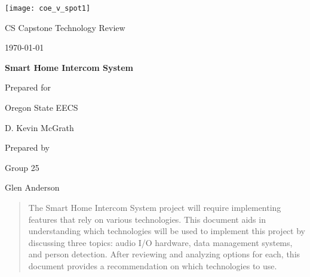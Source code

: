 \documentclass[onecolumn, draftclsnofoot,10pt, compsoc]{IEEEtran}
\def \CapstoneTeamName{			Team 25}
\def \CapstoneTeamNumber{		25}
\def \GroupMemberOne{			Lazar Sharipoff}
\def \GroupMemberTwo{			Jordan Davis}
\def \GroupMemberThree{			Glen Anderson}
\def \CapstoneProjectName{		Smart Home Intercom System}
\def \CapstoneSponsorCompany{	Oregon State EECS}
\def \CapstoneSponsorPerson{		D. Kevin McGrath}
\def \DocType{		%
				Technology Review
				}
\newcommand{\NameSigPair}[1]{\par
\makebox[2.75in][r]{#1} \hfil 	\makebox[3.25in]{\makebox[2.25in]{\hrulefill} \hfill		\makebox[.75in]{\hrulefill}}
\par\vspace{-12pt} \textit{\tiny\noindent
\makebox[2.75in]{} \hfil		\makebox[3.25in]{\makebox[2.25in][r]{Signature} \hfill	\makebox[.75in][r]{Date}}}}
\renewcommand{\NameSigPair}[1]{#1}
\begin{document}
\begin{titlepage}
    \begin{singlespace}
    	\texttt{[image: coe\_v\_spot1]}
        \hfill 
        \par\vspace{.2in}
        \centering
        \scshape{
            \huge CS Capstone \DocType \par
            {\large\today}\par
            \vspace{.5in}
            \textbf{\Huge\CapstoneProjectName}\par
            \vfill
            {\large Prepared for}\par
            \Huge \CapstoneSponsorCompany\par
            \vspace{5pt}
            {\Large\NameSigPair{\CapstoneSponsorPerson}\par}
            {\large Prepared by }\par
            Group\CapstoneTeamNumber\par
            \vspace{5pt}
            {\Large
                \NameSigPair{\GroupMemberThree}\par
            }
            \vspace{20pt}
        }
        \begin{abstract}
        The Smart Home Intercom System project will require implementing features that rely on various technologies.
	This document aids in understanding which technologies will be used to implement this project by discussing three topics: audio I/O hardware, data management systems, and person detection. After reviewing and analyzing options for each, this document provides a recommendation on which technologies to use.

	\end{abstract}     
    \end{singlespace}
\end{titlepage}
\newpage
{}
\tableofcontents
\clearpage
\end{document}
